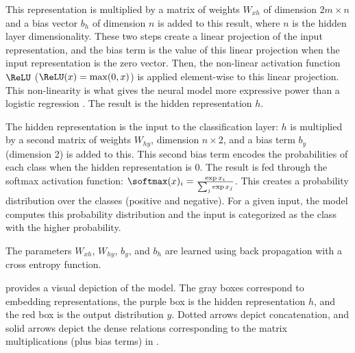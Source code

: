 This representation is multiplied by a matrix of weights $W_{xh}$ of dimension $2m \times n$ and a bias vector $b_{h}$ of dimension $n$ is added to this result, where $n$ is the hidden layer dimensionality. These two steps create a linear projection of the input representation, and the bias term is the value of this linear projection when the input representation is the zero vector. Then, the non-linear activation function $\ReLU$ ($\ReLU(x) = \max(0, x)$) is applied element-wise to this linear projection. This non-linearity is what gives the neural model more expressive power than a logistic regression \citep{Cybenko:1989,Hornik:Stinchcombe:White:1989}. The result is the hidden representation $h$.

The hidden representation is the input to the classification layer: $h$ is multiplied by a second matrix of weights $W_{hy}$, dimension $n \times 2$, and a bias term $b_{y}$ (dimension 2) is added to this. This second bias term encodes the probabilities of each class when the hidden representation is 0. The result is fed through the softmax activation function: $\softmax(x)_{i} = \frac{\exp{x_{i}}}{\sum_{j} \exp{x_{j}}}$. This creates a probability distribution over the classes (positive and negative). For a given input, the model computes this probability distribution and the input is categorized as the class with the higher probability.

The parameters $W_{xh}$, $W_{hy}$, $b_{y}$, and $b_{h}$ are learned using back propagation with a cross entropy function. 

 provides a visual depiction of the model. The gray boxes correspond to embedding representations, the purple box is the hidden representation $h$, and the red box is the output distribution $y$. Dotted arrows depict concatenation, and solid arrows depict the dense relations corresponding to the matrix multiplications (plus bias terms) in .




